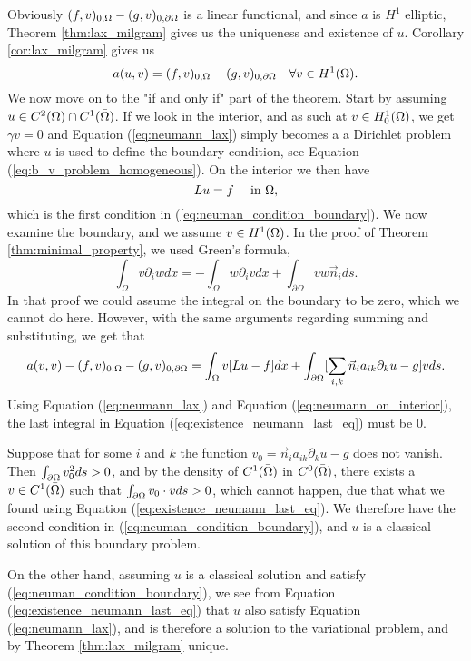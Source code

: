 \begin{bev}
   Obviously $ (f,v)_{0,\Omega} - (g,v)_{0,\partial\Omega}$ is a linear functional, 
   and since $a$ is $H^1$ elliptic, Theorem \ref{thm:lax_milgram} gives us the 
   uniqueness and existence of $u$.
   Corollary \ref{cor:lax_milgram} gives us
   \begin{equation}
      a(u,v) = (f,v)_{0,\Omega} - (g,v)_{0,\partial\Omega} \quad \forall v \in H^1(\Omega). \label{eq:neumann_lax}
   \end{equation}
   We now move on to the "if and only if" part of the theorem. Start by 
   assuming $u \in C^2(\Omega)\cap C^1(\bar{\Omega})$.
   If we look in the interior, and as such at $v \in H^1_0(\Omega)$, we get $\gamma v=0$ 
   and Equation (\ref{eq:neumann_lax}) simply becomes a a Dirichlet problem where 
   $u$ is used to define the boundary condition, see Equation (\ref{eq:b_v_problem_homogeneous}).
   On the interior we then have 
   \begin{equation}
    Lu = f \quad \text{ in }\Omega, \label{eq:neumann_on_interior}
   \end{equation} 
   which is the first condition in (\ref{eq:neuman_condition_boundary}).
   We now examine the boundary, and we assume $v\in H^1(\Omega)$.
   In the proof of Theorem \ref{thm:minimal_property}, we used Green's formula,
    \begin{equation} %
        \int_\Omega v\partial_i w dx = -\int_\Omega w \partial_i v dx + \int_{\partial \Omega} v w \vec{n}_i ds.
    \end{equation}
   In that proof we could assume the integral on the boundary to be zero, which 
   we cannot do here. However, with the same arguments regarding summing and substituting, 
   we get that 
   \begin{equation}
      a(v,v) - (f,v)_{0,\Omega} - (g,v)_{0,\partial\Omega} = 
      \int_\Omega v[Lu - f] dx + \int_{\partial \Omega}
     [ \sum_{i,k}  \vec{n}_i a_{ik} \partial_k u-g]v ds.
     \label{eq:existence_neumann_last_eq}
   \end{equation}
   Using Equation (\ref{eq:neumann_lax}) and Equation (\ref{eq:neumann_on_interior}),
   the last integral in Equation (\ref{eq:existence_neumann_last_eq}) must be $0$.

   Suppose that for some $i$ and $k$ the function $v_0 = \vec{n}_i a_{ik} \partial_k u -g$ does 
   not vanish. Then $\int_{\partial\Omega}v_0^2ds>0$, and by the density of 
   $C^1(\bar{\Omega})$ in $C^0(\bar{\Omega})$, there exists a $v\in C^1(\bar{\Omega})$
   such that  $\int_{\partial\Omega}v_0\cdot vds>0$, which cannot happen, due that 
   what we found using Equation (\ref{eq:existence_neumann_last_eq}). 
   We therefore have the second condition in (\ref{eq:neuman_condition_boundary}),
   and $u$ is a classical solution of this boundary problem.

   On the other hand, assuming $u$ is a classical solution and satisfy (\ref{eq:neuman_condition_boundary}),
   we see from Equation (\ref{eq:existence_neumann_last_eq}) that $u$ also satisfy 
   Equation (\ref{eq:neumann_lax}), and is therefore a solution to the variational 
   problem, and by Theorem \ref{thm:lax_milgram} unique.
\end{bev}